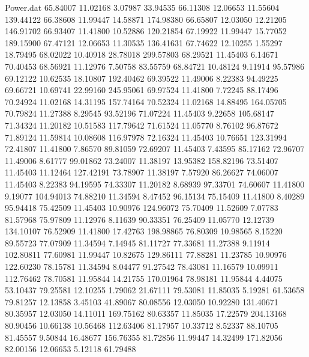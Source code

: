 \begin{filecontents}{Power.dat}
  65.84007   11.02168    3.07987   33.94535
  66.11308   12.06653   11.55604  139.44122
  66.38608   11.99447   14.58871  174.98380
  66.65807   12.03050   12.21205  146.91702
  66.93407   11.41800   10.52886  120.21854
  67.19922   11.99447   15.77052  189.15900
  67.47121   12.06653   11.30535  136.41631
  67.74622   12.10255    1.55297   18.79495
  68.02022   10.40918   28.78018  299.57803
  68.29521   11.45403    6.14671   70.40453
  68.56921   11.12976    7.50758   83.55759
  68.84721   10.48124    9.11914   95.57986
  69.12122   10.62535   18.10807  192.40462
  69.39522   11.49006    8.22383   94.49225
  69.66721   10.69741   22.99160  245.95061
  69.97524   11.41800    7.72245   88.17496
  70.24924   11.02168   14.31195  157.74164
  70.52324   11.02168   14.88495  164.05705
  70.79824   11.27388    8.29545   93.52196
  71.07224   11.45403    9.22658  105.68147
  71.34324   11.20182   10.51583  117.79642
  71.61524   11.05770    8.76102   96.87672
  71.89124   11.59814   10.08608  116.97978
  72.16324   11.45403   10.76651  123.31994
  72.41807   11.41800    7.86570   89.81059
  72.69207   11.45403    7.43595   85.17162
  72.96707   11.49006    8.61777   99.01862
  73.24007   11.38197   13.95382  158.82196
  73.51407   11.45403   11.12464  127.42191
  73.78907   11.38197    7.57920   86.26627
  74.06007   11.45403    8.22383   94.19595
  74.33307   11.20182    8.68939   97.33701
  74.60607   11.41800    9.19077  104.94013
  74.88210   11.34594    8.47452   96.15134
  75.15409   11.41800    8.40289   95.94418
  75.42509   11.45403   10.90976  124.96072
  75.70409   11.52609    7.07783   81.57968
  75.97809   11.12976    8.11639   90.33351
  76.25409   11.05770   12.12739  134.10107
  76.52909   11.41800   17.42763  198.98865
  76.80309   10.98565    8.15220   89.55723
  77.07909   11.34594    7.14945   81.11727
  77.33681   11.27388    9.11914  102.80811
  77.60981   11.99447   10.82675  129.86111
  77.88281   11.23785   10.90976  122.60230
  78.15781   11.34594    8.04477   91.27542
  78.43081   11.16579   10.09911  112.76462
  78.70581   11.95844   14.21755  170.01964
  78.98181   11.95844    4.44075   53.10437
  79.25581   12.10255    1.79062   21.67111
  79.53081   11.85035    5.19281   61.53658
  79.81257   12.13858    3.45103   41.89067
  80.08556   12.03050   10.92280  131.40671
  80.35957   12.03050   14.11011  169.75162
  80.63357   11.85035   17.22579  204.13168
  80.90456   10.66138   10.56468  112.63406
  81.17957   10.33712    8.52337   88.10705
  81.45557    9.50844   16.48677  156.76355
  81.72856   11.99447   14.32499  171.82056
  82.00156   12.06653    5.12118   61.79488

\end{filecontents}
